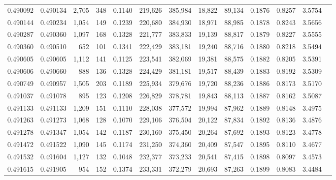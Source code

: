 \begin{tabular}{rrrrrrrrrrrrr}
0.490092 & 0.490134 & 2,705 &   348 &                                     0.1140 & 219,626 & 385,984 &  18,822 &  89,134 & 0.1876 & 0.8257 & 3.5754 \\
0.490144 & 0.490234 & 1,054 &   149 &                                     0.1239 & 220,680 & 384,930 &  18,971 &  88,985 & 0.1878 & 0.8243 & 3.5656 \\
0.490287 & 0.490360 & 1,097 &   168 &                                     0.1328 & 221,777 & 383,833 &  19,139 &  88,817 & 0.1879 & 0.8227 & 3.5555 \\
0.490360 & 0.490510 &   652 &   101 &                                     0.1341 & 222,429 & 383,181 &  19,240 &  88,716 & 0.1880 & 0.8218 & 3.5494 \\
0.490605 & 0.490605 & 1,112 &   141 &                                     0.1125 & 223,541 & 382,069 &  19,381 &  88,575 & 0.1882 & 0.8205 & 3.5391 \\
0.490606 & 0.490660 &   888 &   136 &                                     0.1328 & 224,429 & 381,181 &  19,517 &  88,439 & 0.1883 & 0.8192 & 3.5309 \\
0.490749 & 0.490957 & 1,505 &   203 &                                     0.1189 & 225,934 & 379,676 &  19,720 &  88,236 & 0.1886 & 0.8173 & 3.5170 \\
0.491037 & 0.491078 &   895 &   123 &                                     0.1208 & 226,829 & 378,781 &  19,843 &  88,113 & 0.1887 & 0.8162 & 3.5087 \\
0.491133 & 0.491133 & 1,209 &   151 &                                     0.1110 & 228,038 & 377,572 &  19,994 &  87,962 & 0.1889 & 0.8148 & 3.4975 \\
0.491263 & 0.491273 & 1,068 &   128 &                                     0.1070 & 229,106 & 376,504 &  20,122 &  87,834 & 0.1892 & 0.8136 & 3.4876 \\
0.491278 & 0.491347 & 1,054 &   142 &                                     0.1187 & 230,160 & 375,450 &  20,264 &  87,692 & 0.1893 & 0.8123 & 3.4778 \\
0.491472 & 0.491522 & 1,090 &   145 &                                     0.1174 & 231,250 & 374,360 &  20,409 &  87,547 & 0.1895 & 0.8110 & 3.4677 \\
0.491532 & 0.491604 & 1,127 &   132 &                                     0.1048 & 232,377 & 373,233 &  20,541 &  87,415 & 0.1898 & 0.8097 & 3.4573 \\
0.491615 & 0.491905 &   954 &   152 &                                     0.1374 & 233,331 & 372,279 &  20,693 &  87,263 & 0.1899 & 0.8083 & 3.4484 \\

\end{tabular}
